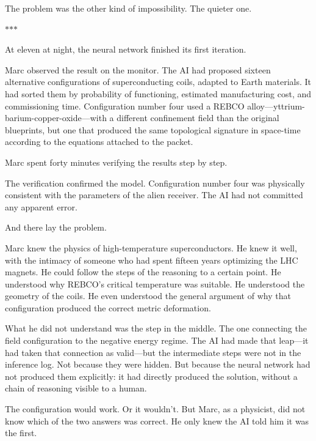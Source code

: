 \documentclass[11pt,a5paper,twoside]{book}
\begin{document}
The problem was the other kind of impossibility. The quieter one.

\vspace{1.5em}
\begin{center}$\ast$\quad$\ast$\quad$\ast$\end{center}
\vspace{1.5em}

At eleven at night, the neural network finished its first iteration.

Marc observed the result on the monitor. The AI had proposed sixteen alternative configurations of superconducting coils, adapted to Earth materials. It had sorted them by probability of functioning, estimated manufacturing cost, and commissioning time. Configuration number four used a REBCO alloy—yttrium-barium-copper-oxide—with a different confinement field than the original blueprints, but one that produced the same topological signature in space-time according to the equations attached to the packet.

Marc spent forty minutes verifying the results step by step.

The verification confirmed the model. Configuration number four was physically consistent with the parameters of the alien receiver. The AI had not committed any apparent error.

And there lay the problem.

Marc knew the physics of high-temperature superconductors. He knew it well, with the intimacy of someone who had spent fifteen years optimizing the LHC magnets. He could follow the steps of the reasoning to a certain point. He understood why REBCO's critical temperature was suitable. He understood the geometry of the coils. He even understood the general argument of why that configuration produced the correct metric deformation.

What he did not understand was the step in the middle. The one connecting the field configuration to the negative energy regime. The AI had made that leap—it had taken that connection as valid—but the intermediate steps were not in the inference log. Not because they were hidden. But because the neural network had not produced them explicitly: it had directly produced the solution, without a chain of reasoning visible to a human.

The configuration would work. Or it wouldn't. But Marc, as a physicist, did not know which of the two answers was correct. He only knew the AI told him it was the first.
\end{document}
